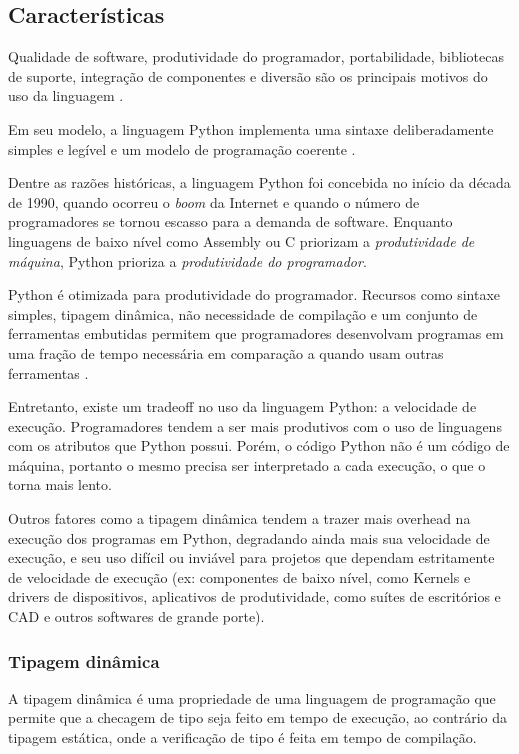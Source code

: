 \subsection{Características}
Qualidade de software, produtividade do programador, portabilidade, bibliotecas de suporte, integração de componentes e diversão são os principais motivos do uso da linguagem \cite[p. 48,49]{learningpython}. 

Em seu modelo, a linguagem Python implementa uma sintaxe deliberadamente simples e legível e um modelo de programação coerente \cite[p. 50]{learningpython}. 

Dentre as razões históricas, a linguagem Python foi concebida no início da década de 1990, quando ocorreu o \emph{boom} da Internet e quando o número de programadores se tornou escasso para a demanda de software. Enquanto linguagens de baixo nível como Assembly ou C priorizam a \emph{produtividade de máquina}, Python prioriza a \emph{produtividade do programador}. 

Python é otimizada para produtividade do programador. Recursos como sintaxe simples, tipagem dinâmica, não necessidade de compilação e um conjunto de ferramentas embutidas permitem que programadores desenvolvam programas em uma fração de tempo necessária em comparação a quando usam outras ferramentas \cite[p. 50]{learningpython}. 

Entretanto, existe um \gls{tradeoff} no uso da linguagem Python: a velocidade de execução. Programadores tendem a ser mais produtivos com o uso de linguagens com os atributos que Python possui. Porém, o código Python não é um código de máquina, portanto o mesmo precisa ser interpretado a cada execução, o que o torna mais lento. 

Outros fatores como a tipagem dinâmica tendem a trazer mais \gls{overhead} na execução dos programas em Python, degradando ainda mais sua velocidade de execução, e seu uso difícil ou inviável para projetos que dependam estritamente de velocidade de execução (ex: componentes de baixo nível, como Kernels e drivers de dispositivos, aplicativos de produtividade, como suítes de escritórios e CAD e outros softwares de grande porte).

\subsubsection{Tipagem dinâmica}

A tipagem dinâmica é uma propriedade de uma linguagem de programação que permite que a checagem de tipo seja feito em tempo de execução, ao contrário da tipagem estática, onde a verificação de tipo é feita em tempo de compilação.


